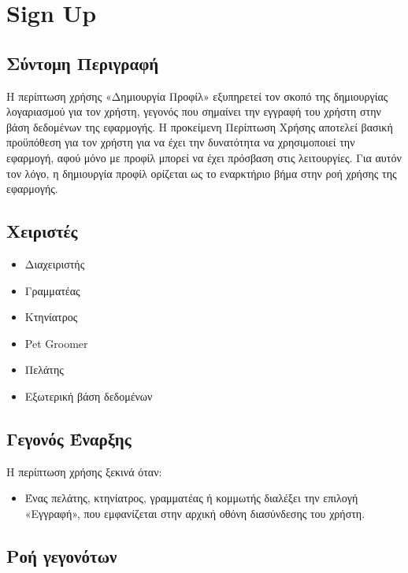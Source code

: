 \documentclass[12pt,a4paper,twoside]{book}
\begin{document}
\section{Sign Up}

\subsection{Σύντομη Περιγραφή}
Η περίπτωση χρήσης «Δημιουργία Προφίλ» εξυπηρετεί τον σκοπό της δημιουργίας λογαριασμού για τον χρήστη, γεγονός που σημαίνει την εγγραφή του χρήστη στην βάση δεδομένων της εφαρμογής. Η προκείμενη Περίπτωση Χρήσης αποτελεί βασική προϋπόθεση για τον χρήστη για να έχει την δυνατότητα να χρησιμοποιεί την εφαρμογή, αφού μόνο με προφίλ μπορεί να έχει πρόσβαση στις λειτουργίες. Για αυτόν τον λόγο, η δημιουργία προφίλ ορίζεται ως το εναρκτήριο βήμα στην ροή χρήσης της εφαρμογής. %

\subsection{Χειριστές}
\begin{itemize}
  \item Διαχειριστής
  \item Γραμματέας
  \item Κτηνίατρος
  \item Pet Groomer
  \item Πελάτης
  \item Εξωτερική βάση δεδομένων %
\end{itemize}

\subsection{Γεγονός Έναρξης}
Η περίπτωση χρήσης ξεκινά όταν:
\begin{itemize}
  \item Ένας πελάτης, κτηνίατρος, γραμματέας ή κομμωτής διαλέξει την επιλογή «Εγγραφή», που εμφανίζεται στην αρχική οθόνη διασύνδεσης του χρήστη.  %
\end{itemize}

\subsection{Ροή γεγονότων}
\end{document}
